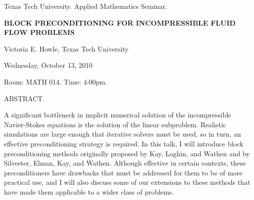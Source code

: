 \documentclass[oneside]{amsart}
\newcommand{\talktitle}{Block Preconditioning for Incompressible Fluid Flow Problems}
\newcommand{\talkspeaker}{Victoria E. Howle, Texas Tech University}
\newcommand{\talkdate}{Wednesday, October 13, 2010}
\newcommand{\talkabstract}{
A significant bottleneck in implicit numerical solution of the incompressible Navier-Stokes equations is the solution of the linear subproblem. Realistic simulations are large enough that iterative solvers must be used, so in turn, an effective preconditioning strategy is required. In this talk, I will introduce block preconditioning methods originally proposed by Kay, Loghin, and Wathen and by Silvester, Elman, Kay, and Wathen.  Although effective in certain contexts, these preconditioners have drawbacks that must be addressed for them to be of more practical use, and I will also discuss some of our extensions to these methods that have made them applicable to a wider class of problems.
}
\begin{document}
\thispagestyle{empty}

\begin{center}
Texas Tech University.  Applied Mathematics Seminar.

\end{center}

\begin{center}

\textbf{\LARGE {\uppercase{\talktitle}} }

\talkspeaker

\talkdate

Room: MATH 014.  Time: 4:00pm.

\end{center}

ABSTRACT.
\talkabstract
\end{document}
